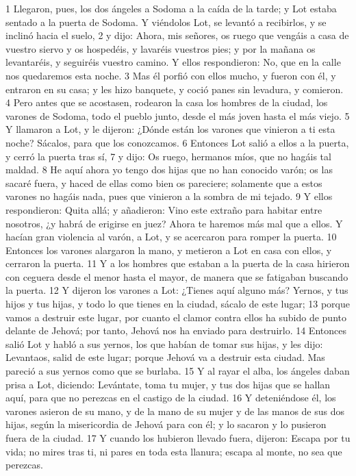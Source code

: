 1 Llegaron, pues, los dos ángeles a Sodoma a la caída de la tarde; y Lot estaba sentado a la puerta de Sodoma. Y viéndolos Lot, se levantó a recibirlos, y se inclinó hacia el suelo,
2 y dijo: Ahora, mis señores, os ruego que vengáis a casa de vuestro siervo y os hospedéis, y lavaréis vuestros pies; y por la mañana os levantaréis, y seguiréis vuestro camino. Y ellos respondieron: No, que en la calle nos quedaremos esta noche.
3 Mas él porfió con ellos mucho, y fueron con él, y entraron en su casa; y les hizo banquete, y coció panes sin levadura, y comieron.
4 Pero antes que se acostasen, rodearon la casa los hombres de la ciudad, los varones de Sodoma, todo el pueblo junto, desde el más joven hasta el más viejo.
5 Y llamaron a Lot, y le dijeron: ¿Dónde están los varones que vinieron a ti esta noche? Sácalos, para que los conozcamos.
6 Entonces Lot salió a ellos a la puerta, y cerró la puerta tras sí,
7 y dijo: Os ruego, hermanos míos, que no hagáis tal maldad.
8 He aquí ahora yo tengo dos hijas que no han conocido varón; os las sacaré fuera, y haced de ellas como bien os pareciere; solamente que a estos varones no hagáis nada, pues que vinieron a la sombra de mi tejado.
9 Y ellos respondieron: Quita allá; y añadieron: Vino este extraño para habitar entre nosotros, ¿y habrá de erigirse en juez? Ahora te haremos más mal que a ellos. Y hacían gran violencia al varón, a Lot, y se acercaron para romper la puerta.
10 Entonces los varones alargaron la mano, y metieron a Lot en casa con ellos, y cerraron la puerta.
11 Y a los hombres que estaban a la puerta de la casa hirieron con ceguera desde el menor hasta el mayor, de manera que se fatigaban buscando la puerta.
12 Y dijeron los varones a Lot: ¿Tienes aquí alguno más? Yernos, y tus hijos y tus hijas, y todo lo que tienes en la ciudad, sácalo de este lugar;
13 porque vamos a destruir este lugar, por cuanto el clamor contra ellos ha subido de punto delante de Jehová; por tanto, Jehová nos ha enviado para destruirlo.
14 Entonces salió Lot y habló a sus yernos, los que habían de tomar sus hijas, y les dijo: Levantaos, salid de este lugar; porque Jehová va a destruir esta ciudad. Mas pareció a sus yernos como que se burlaba.
15 Y al rayar el alba, los ángeles daban prisa a Lot, diciendo: Levántate, toma tu mujer, y tus dos hijas que se hallan aquí, para que no perezcas en el castigo de la ciudad.
16 Y deteniéndose él, los varones asieron de su mano, y de la mano de su mujer y de las manos de sus dos hijas, según la misericordia de Jehová para con él; y lo sacaron y lo pusieron fuera de la ciudad.
17 Y cuando los hubieron llevado fuera, dijeron: Escapa por tu vida; no mires tras ti, ni pares en toda esta llanura; escapa al monte, no sea que perezcas.
